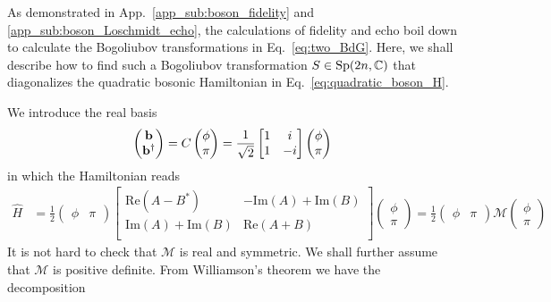 As demonstrated in App.~\ref{app_sub:boson_fidelity} and \ref{app_sub:boson_Loschmidt_echo}, the calculations of fidelity and echo boil down to calculate the Bogoliubov transformations in Eq.~\eqref{eq:two_BdG}. Here, we shall describe how to find such a Bogoliubov transformation $S \in {\rm Sp}(2n, \mathbb{C})$ that diagonalizes the quadratic bosonic Hamiltonian in Eq.~\eqref{eq:quadratic_boson_H}. 

We introduce the real basis 
\begin{equation}\begin{aligned}
\label{eq:real_basis}
\begin{pmatrix}
{\bf b}\\
{\bf b}^\dagger
\end{pmatrix}
=C\begin{pmatrix}
\phi\\
\pi
\end{pmatrix}
=\frac{1}{\sqrt{2}}\begin{bmatrix}
1 & i \\
1 & -i
\end{bmatrix}\begin{pmatrix}
\phi\\
\pi
\end{pmatrix}
\end{aligned}\end{equation}
in which the Hamiltonian reads
\begin{equation}\begin{aligned}
\hat{H}
&=\frac{1}{2}
\begin{pmatrix}
\phi & \pi
\end{pmatrix}
\begin{bmatrix}
\text{Re}(A-B^*) & -\text{Im}(A)+\text{Im}(B)\\
\text{Im}(A)+\text{Im}(B)& \text{Re}(A+B) \\
\end{bmatrix}
\begin{pmatrix}
\phi\\
\pi
\end{pmatrix}
=\frac{1}{2}
\begin{pmatrix}
\phi & \pi
\end{pmatrix}
\mathcal{M}
\begin{pmatrix}
\phi\\
\pi
\end{pmatrix}
\end{aligned}\end{equation}
It is not hard to check that $\mathcal{M}$ is real and symmetric. We shall further assume that $\mathcal{M}$ is positive definite. From Williamson's theorem\cite{arnold_mathematical_2010,xiao_theory_2009,pirandola_correlation_2009,gosson_symplectic_2006} we have the decomposition
